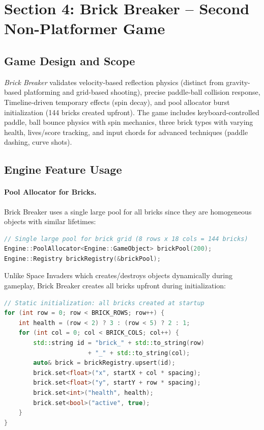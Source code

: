 \documentclass[12pt]{article}
\begin{document}
\section{Section 4: Brick Breaker – Second Non-Platformer Game}

\subsection{Game Design and Scope}

\emph{Brick Breaker} validates velocity-based reflection physics (distinct from gravity-based platforming and grid-based shooting), precise paddle-ball collision response, Timeline-driven temporary effects (spin decay), and pool allocator burst initialization (144 bricks created upfront). The game includes keyboard-controlled paddle, ball bounce physics with spin mechanics, three brick types with varying health, lives/score tracking, and input chords for advanced techniques (paddle dashing, curve shots).

\subsection{Engine Feature Usage}

\paragraph{Pool Allocator for Bricks.}
Brick Breaker uses a single large pool for all bricks since they are homogeneous objects with similar lifetimes:

\begin{lstlisting}[language=C++]
// Single large pool for brick grid (8 rows x 18 cols = 144 bricks)
Engine::PoolAllocator<Engine::GameObject> brickPool(200);
Engine::Registry brickRegistry(&brickPool);
\end{lstlisting}

Unlike Space Invaders which creates/destroys objects dynamically during gameplay, Brick Breaker creates all bricks upfront during initialization:

\begin{lstlisting}[language=C++]
// Static initialization: all bricks created at startup
for (int row = 0; row < BRICK_ROWS; row++) {
    int health = (row < 2) ? 3 : (row < 5) ? 2 : 1;
    for (int col = 0; col < BRICK_COLS; col++) {
        std::string id = "brick_" + std::to_string(row) 
                       + "_" + std::to_string(col);
        auto& brick = brickRegistry.upsert(id);
        brick.set<float>("x", startX + col * spacing);
        brick.set<float>("y", startY + row * spacing);
        brick.set<int>("health", health);
        brick.set<bool>("active", true);
    }
}
\end{lstlisting}
\end{document}
